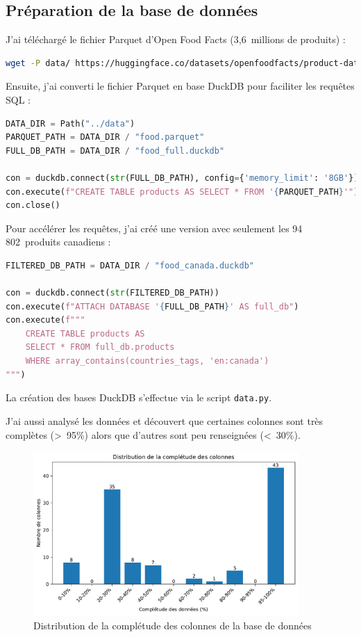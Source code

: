 \documentclass[a4paper,11pt]{article}
\begin{document}
\subsection{Préparation de la base de données}

J'ai téléchargé le fichier Parquet d'Open Food Facts (3,6~millions de produits) :

\begin{lstlisting}[language=bash, caption=Téléchargement du fichier Parquet]
wget -P data/ https://huggingface.co/datasets/openfoodfacts/product-database/resolve/main/food.parquet
\end{lstlisting}

Ensuite, j'ai converti le fichier Parquet en base DuckDB pour faciliter les requêtes SQL :

\begin{lstlisting}[language=Python, caption=Conversion en base DuckDB]
DATA_DIR = Path("../data")
PARQUET_PATH = DATA_DIR / "food.parquet"
FULL_DB_PATH = DATA_DIR / "food_full.duckdb"

con = duckdb.connect(str(FULL_DB_PATH), config={'memory_limit': '8GB'})
con.execute(f"CREATE TABLE products AS SELECT * FROM '{PARQUET_PATH}'")
con.close()
\end{lstlisting}

Pour accélérer les requêtes, j'ai créé une version avec seulement les 94\,802~produits canadiens :

\begin{lstlisting}[language=Python]
FILTERED_DB_PATH = DATA_DIR / "food_canada.duckdb"

con = duckdb.connect(str(FILTERED_DB_PATH))
con.execute(f"ATTACH DATABASE '{FULL_DB_PATH}' AS full_db")
con.execute(f"""
    CREATE TABLE products AS 
    SELECT * FROM full_db.products
    WHERE array_contains(countries_tags, 'en:canada')
""")
\end{lstlisting}

La création des bases DuckDB s'effectue via le script \texttt{data.py}.

J'ai aussi analysé les données et découvert que certaines colonnes sont très complètes (>~95\%) alors que d'autres sont peu renseignées (<~30\%).

\begin{figure}[htbp]
    \centering
    \includegraphics[width=0.9\textwidth]{figures/missing_values.pdf}
    \caption{Distribution de la complétude des colonnes de la base de données}
    \label{fig:missing-values}
\end{figure}
\end{document}
